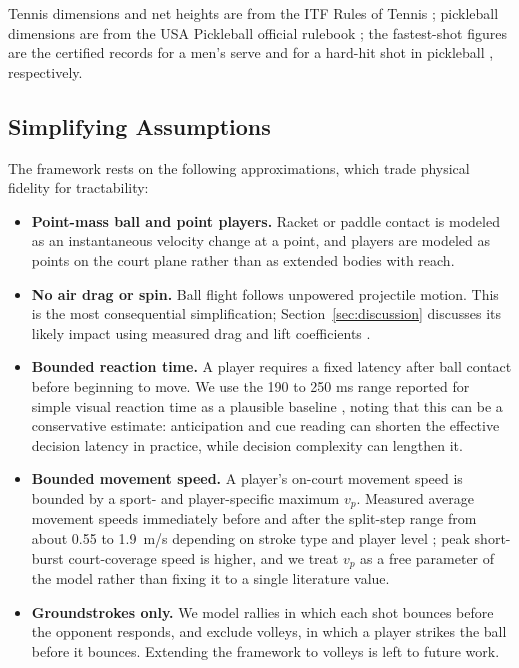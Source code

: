   Tennis dimensions and net heights are from the ITF Rules of Tennis
  \cite{itf2024rules}; pickleball dimensions are from the USA Pickleball
  official rulebook \cite{usap2025rulebook}; the fastest-shot figures are the
  certified records for a men's serve \cite{guinness2012serve} and for a
  hard-hit shot in pickleball \cite{guinness2025pickleball}, respectively.

  \subsection{Simplifying Assumptions}\label{sec:assumptions}

  The framework rests on the following approximations, which trade physical
  fidelity for tractability:

  \begin{itemize}
    \item \textbf{Point-mass ball and point players.} Racket or paddle contact
    is modeled as an instantaneous velocity change at a point, and players are
    modeled as points on the court plane rather than as extended bodies with
    reach.

    \item \textbf{No air drag or spin.} Ball flight follows unpowered projectile
    motion. This is the most consequential simplification;
    Section~\ref{sec:discussion} discusses its likely impact using measured
    drag and lift coefficients \cite{cross2014drag}.

    \item \textbf{Bounded reaction time.} A player requires a fixed latency
    after ball contact before beginning to move. We use the 190 to 250 ms range
    reported for simple visual reaction time as a plausible baseline
    \cite{woods2015reaction}, noting that this can be a conservative estimate:
    anticipation and cue reading can shorten the effective decision latency in
    practice, while decision complexity can lengthen it.

    \item \textbf{Bounded movement speed.} A player's on-court movement speed is
    bounded by a sport- and player-specific maximum $v_p$. Measured average
    movement speeds immediately before and after the split-step range from
    about 0.55 to 1.9~m/s depending on stroke type and player level
    \cite{filipcic2017splitstep}; peak short-burst court-coverage speed is
    higher, and we treat $v_p$ as a free parameter of the model rather than
    fixing it to a single literature value.

    \item \textbf{Groundstrokes only.} We model rallies in which each shot
    bounces before the opponent responds, and exclude volleys, in which a player
    strikes the ball before it bounces. Extending the framework to volleys is
    left to future work.
  \end{itemize}

